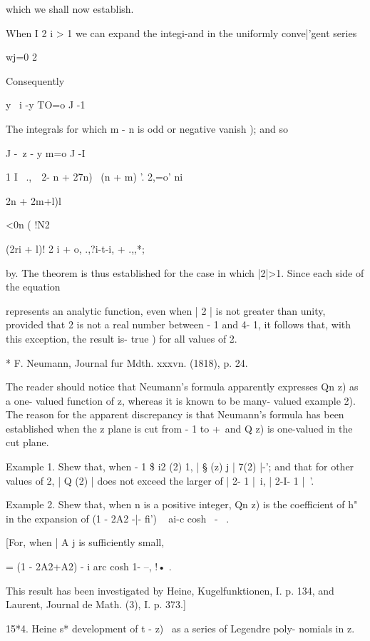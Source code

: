 {{which we shall now establish.

When I 2 i > 1 we can expand the integi-and in the uniformly
conve|'gent series

wj=0 2

Consequently

 y \ i -y TO=o J -1

The integrals for which m - n is odd or negative vanish );
and so

  J -\ z - y m=o J -I

 1 I \ .,\, \, 2- n + 27n) \ (n + m) '. 2,=o' ni\ \ {2n + 2m+l)l

<0n ( !N2

(2ri + l)! 2 i + o, .,?i-t-i, + .,,*;

by. The theorem is thus established for the case in which
|2|>1. Since each side of the equation

represents an analytic function, even when | 2 | is not greater than
unity, provided that 2 is not a real number between - 1 and 4- 1, it
follows that, with this exception, the result is- true ) for all
values of 2.

* F. Neumann, Journal fur Mdth. xxxvn. (1818), p. 24.

%
%

The reader should notice that Neumann's formula apparently expresses
Qn z) as a one- valued function of z, whereas it is known to be many-
valued  example 2). The reason for the apparent discrepancy is
that Neumann's formula has been established when the z plane is cut
from - 1 to +\, and Q z) is one-valued in the cut plane.

Example 1. Shew that, when - 1 \$ i2 (2) 1, | § (z) j | 7(2) |-'; and
that for other values of 2, | Q (2) | does not exceed the larger of |
2- 1 |~i, | 2-I- 1 |~'.

Example 2. Shew that, when n is a positive integer, Qn z) is the
coefficient of h" in the expansion of (1 - 2A2 -|- fi') ~ ai-c cosh \
- \ .

[For, when | A j is sufficiently small,

= (1 - 2A2+A2) - i arc cosh 1- --, !• .

This result has been investigated by Heine, Kugelfunktionen, I. p.
134, and Laurent, Journal de Math. (3), I. p. 373.]

15*4. Heine s* development of t - z)~ as a series of Legendre poly-
nomials in z.

}}}
